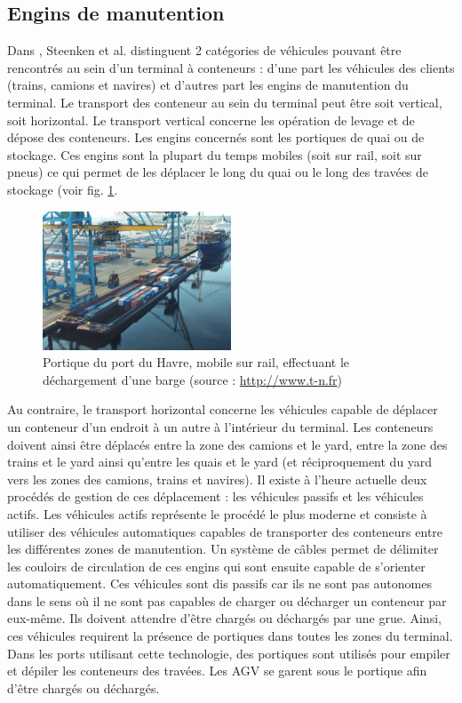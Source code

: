 \subsection{Engins de manutention}

Dans \cite{Steenken2004}, Steenken et al. distinguent 2 catégories de véhicules pouvant être rencontrés au sein d'un terminal à conteneurs : d'une part les véhicules des clients (trains, camions et navires) et d'autres part les engins de manutention du terminal.
Le transport des conteneur au sein du terminal peut être soit vertical, soit horizontal. Le transport vertical concerne les opération de levage et de dépose des conteneurs. Les engins concernés sont les portiques de quai ou de stockage. Ces engins sont la plupart du temps mobiles (soit sur rail, soit sur pneus) ce qui permet de les déplacer le long du quai ou le long des travées de stockage (voir fig. \ref{fig:portiqueBarge}. 

\begin{figure}[ht]
 \begin{center}
  \includegraphics[width=0.5\textwidth]{chapitres/application/portique_barge.jpg}
  \caption{Portique du port du Havre, mobile sur rail, effectuant le déchargement d'une barge (source : \url{http://www.t-n.fr})}
  \label{fig:portiqueBarge}
 \end{center}
\end{figure}

Au contraire, le transport horizontal concerne les véhicules capable de déplacer un conteneur d'un endroit à un autre à l'intérieur du terminal. Les conteneurs doivent ainsi être déplacés entre la zone des camions et le yard, entre la zone des trains et le yard ainsi qu'entre les quais et le yard (et réciproquement du yard vers les zones des camions, trains et navires).
Il existe à l'heure actuelle deux procédés de gestion de ces déplacement : les véhicules passifs et les véhicules actifs.
Les véhicules actifs représente le procédé le plus moderne et consiste à utiliser des véhicules automatiques capables de transporter des conteneurs entre les différentes zones de manutention. Un système de câbles permet de délimiter les couloirs de circulation de ces engins qui sont ensuite capable de s'orienter automatiquement. Ces véhicules sont dis passifs car ils ne sont pas autonomes dans le sens où il ne sont pas capables de charger ou décharger un conteneur par eux-même. Ils doivent attendre d'être chargés ou déchargés par une grue. Ainsi, ces véhicules requirent la présence de portiques dans toutes les zones du terminal. Dans les ports utilisant cette technologie, des portiques sont utilisés pour empiler et dépiler les conteneurs des travées. Les AGV se garent sous le portique afin d'être chargés ou déchargés.

